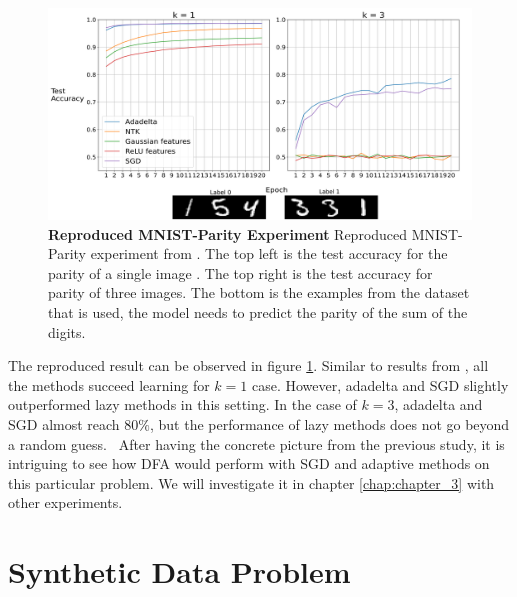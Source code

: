\documentclass[a4paper, nobind]{templates/ociamthesis}
\begin{document}
\begin{figure}

{\centering \includegraphics[width=1\linewidth]{figures/2_k13_SGD_ada_BP_reproduced} 

}

\caption[Reproduced MNIST-Parity Experiment]{\textbf{Reproduced MNIST-Parity Experiment} \newline Reproduced MNIST-Parity experiment from \cite{DBLP:journals/corr/abs-2002-07400}. The top left is the test accuracy for the parity of a single image . The top right is the test accuracy for parity of three images. The bottom is the examples from the dataset that is used, the model needs to predict the parity of the sum of the digits.}\label{fig:MNISTparity}
\end{figure}

\noindent The reproduced result can be observed in figure \ref{fig:MNISTparity}. Similar to results from \cite{DBLP:journals/corr/abs-2002-07400}, all the methods succeed learning for \(k=1\) case. However, adadelta and SGD slightly outperformed lazy methods in this setting. In the case of \(k=3\), adadelta and SGD almost reach \(80\%\), but the performance of lazy methods does not go beyond a random guess.~
After having the concrete picture from the previous study, it is intriguing to see how DFA would perform with SGD and adaptive methods on this particular problem. We will investigate it in chapter \ref{chap:chapter_3} with other experiments.

\hypertarget{synthetic-data-problem}{%
\section{Synthetic Data Problem}\label{synthetic-data-problem}}
\end{document}

